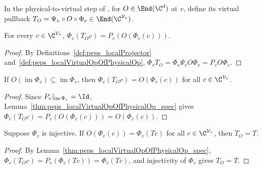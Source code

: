 \begin{definition}%
    \label{def:peps_localVirtualOpOfPhysicalOp}
    \leanok
    In the physical-to-virtual step of \cite[Section~3]{Molnar2018NormalPEPS},
    for $O\in\End(\C^d)$ at $v$, define its virtual pullback
    $T_O=\Psi_v\circ O\circ\Phi_v\in\End(\C^{\mathcal V_v})$.
\end{definition}

\begin{lemma}%
    \label{thm:peps_localVirtualOpOfPhysicalOp_spec}
    \leanok
    For every $c\in\C^{\mathcal V_v}$,
    $\Phi_v(T_Oc)=P_v(O(\Phi_v(c)))$.
\end{lemma}
\begin{proof}\leanok
    By Definitions~\ref{def:peps_localProjector}
    and~\ref{def:peps_localVirtualOpOfPhysicalOp},
    $\Phi_vT_O=\Phi_v\Psi_vO\Phi_v=P_vO\Phi_v$.
\end{proof}

\begin{lemma}%
    \label{thm:peps_localVirtualOpOfPhysicalOp_realizes_of_projector}
    \leanok
    If $O(\operatorname{im}\Phi_v)\subseteq\operatorname{im}\Phi_v$, then
    $\Phi_v(T_Oc)=O(\Phi_v(c))$ for all $c\in\C^{\mathcal V_v}$.
\end{lemma}
\begin{proof}\leanok
    Since $P_v|_{\operatorname{im}\Phi_v}=\Id$,
    Lemma~\ref{thm:peps_localVirtualOpOfPhysicalOp_spec} gives
    $\Phi_v(T_Oc)=P_v(O(\Phi_v(c)))=O(\Phi_v(c))$.
\end{proof}

\begin{lemma}%
    \label{thm:peps_localVirtualOpOfPhysicalOp_eq_of_realizes}
    \leanok
    Suppose $\Phi_v$ is injective. If $O(\Phi_v(c))=\Phi_v(Tc)$ for all
    $c\in\C^{\mathcal V_v}$, then $T_O=T$.
\end{lemma}
\begin{proof}\leanok
    By Lemma~\ref{thm:peps_localVirtualOpOfPhysicalOp_spec},
    $\Phi_v(T_Oc)=P_v(\Phi_v(Tc))=\Phi_v(Tc)$, and injectivity of $\Phi_v$
    gives $T_O=T$.
\end{proof}


